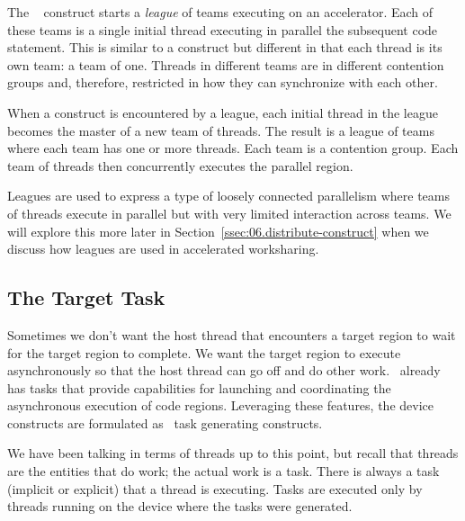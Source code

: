 The ~ construct %
starts a \emph{league} of teams executing
on an accelerator. Each of these teams is a single initial thread executing
in parallel the subsequent code statement.  This is similar to a
 construct but different in that each thread is its own team: a
team of one.  Threads in different teams are in different contention groups
and, therefore, restricted in how they can synchronize with each other.  

When a  construct is encountered by a league, each initial
thread in the league becomes the master of a new team of threads. The result is
a league of teams where each team has one or more threads. Each team is a
contention group.  Each team of threads then concurrently executes the parallel
region.

Leagues are used to express a type of loosely connected parallelism where teams
of threads execute in parallel but with very limited interaction across teams.
We will explore this more later in Section~\ref{ssec:06.distribute-construct}
when we discuss how leagues are used in accelerated worksharing.

\subsection{The Target Task}
\label{ssec:06.target-task}

Sometimes we don't want the host thread that encounters a target region to wait
for the target region to complete.  We want the target region to execute
asynchronously so that the host thread can go off and do other work.
\OMP\ already has tasks that provide capabilities for launching and
coordinating the asynchronous execution of code regions.  Leveraging these
features, the device constructs are formulated as \OMP\ task generating
constructs. 

We have been talking in terms of threads up to this point, but recall that
threads are the entities that do work; the actual work is a task.  There is
always a task (implicit or explicit) that a thread is executing.  Tasks are
executed only by threads running on the device where the tasks were generated.

